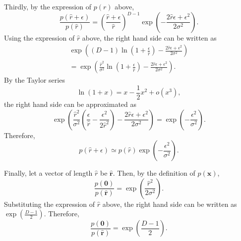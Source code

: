 Thirdly, by the expression of $p(r)$ above,
%
\begin{equation}
\frac{p \left( \hat{r} + \epsilon \right)}{p \left( \hat{r} \right)} = \left( \frac{\hat{r} + \epsilon}{\hat{r}} \right) ^ {D - 1} \exp \left( - \frac{2 \hat{r} \epsilon + \epsilon ^ 2}{2 \sigma ^ 2} \right).
\end{equation}
%
Using the expression of $\hat{r}$ above, the right hand side can be written as
%
\begin{equation}
\begin{aligned}
\exp \left( (D - 1) \ln \left( 1 + \frac{\epsilon}{\hat{r}} \right) - \frac{2 \hat{r} \epsilon + \epsilon ^ 2}{2 \sigma ^ 2} \right) \\
= \exp \left( \frac{\hat{r} ^ 2}{\sigma ^ 2} \ln \left( 1 + \frac{\epsilon}{\hat{r}} \right) - \frac{2 \hat{r} \epsilon + \epsilon ^ 2}{2 \sigma ^ 2} \right).
\end{aligned}
\end{equation}
%
By the Taylor series
%
\begin{equation}
\ln (1 + x) = x - \frac{1}{2} x ^ 2 + o \left( x ^ 3 \right),
\end{equation}
%
the right hand side can be approximated as
%
\begin{equation}
\exp \left( \frac{\hat{r} ^ 2}{\sigma ^ 2} \left( \frac{\epsilon}{\hat{r}} - \frac{\epsilon ^ 2}{2 {\hat{r}} ^ 2} \right) - \frac{2 \hat{r} \epsilon + \epsilon ^ 2}{2 \sigma ^ 2} \right) = \exp \left( - \frac{\epsilon ^ 2}{\sigma ^ 2} \right).
\end{equation}
%
Therefore,
%
\begin{equation}
p \left( \hat{r} + \epsilon \right) \simeq p \left( \hat{r} \right) \exp \left( - \frac{\epsilon ^ 2}{\sigma ^ 2} \right).
\end{equation}
%

Finally, let a vector of length $\hat{r}$ be $\hat{\mathbf{r}}$.
Then, by the definition of $p(\mathbf{x})$,
%
\begin{equation}
\frac{p(\mathbf{0})}{p \left( \hat{\mathbf{r}} \right)} = \exp \left( \frac{\hat{r} ^ 2}{2 \sigma ^2} \right).
\end{equation}
%
Substituting the expression of $\hat{r}$ above, the right hand side can be written as $\exp \left( \frac{D - 1}{2} \right)$.
Therefore,
%
\begin{equation}
\frac{p(\mathbf{0})}{p \left( \hat{\mathbf{r}} \right)} = \exp \left( \frac{D - 1}{2} \right).
\end{equation}
%


